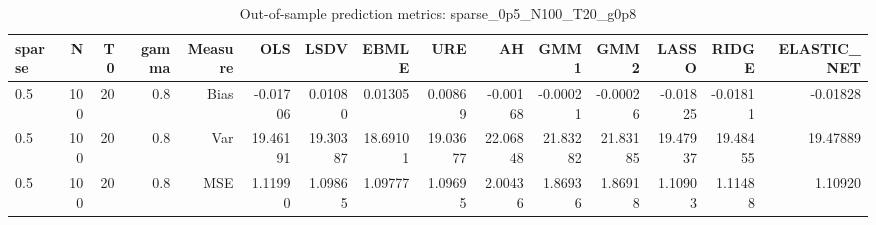 \begin{table}[!htbp]\centering
\caption{Out-of-sample prediction metrics: sparse_0p5_N100_T20_g0p8}
\label{tab:table3_sparse_0p5_N100_T20_g0p8}
\begin{tabular}{lrrrrrrrrrrrrrr}
\hline
sparse & N & T0 & gamma & Measure & OLS & LSDV & EBMLE & URE & AH & GMM1 & GMM2 & LASSO & RIDGE & ELASTIC_NET \\
\hline
0.5 & 100 & 20 & 0.8 & Bias & -0.01706 & 0.01080 & 0.01305 & 0.00869 & -0.00168 & -0.00021 & -0.00026 & -0.01825 & -0.01811 & -0.01828 \\
0.5 & 100 & 20 & 0.8 & Var & 19.46191 & 19.30387 & 18.69101 & 19.03677 & 22.06848 & 21.83282 & 21.83185 & 19.47937 & 19.48455 & 19.47889 \\
0.5 & 100 & 20 & 0.8 & MSE & 1.11990 & 1.09865 & 1.09777 & 1.09695 & 2.00436 & 1.86936 & 1.86918 & 1.10903 & 1.11488 & 1.10920 \\
\hline
\end{tabular}
\end{table}

